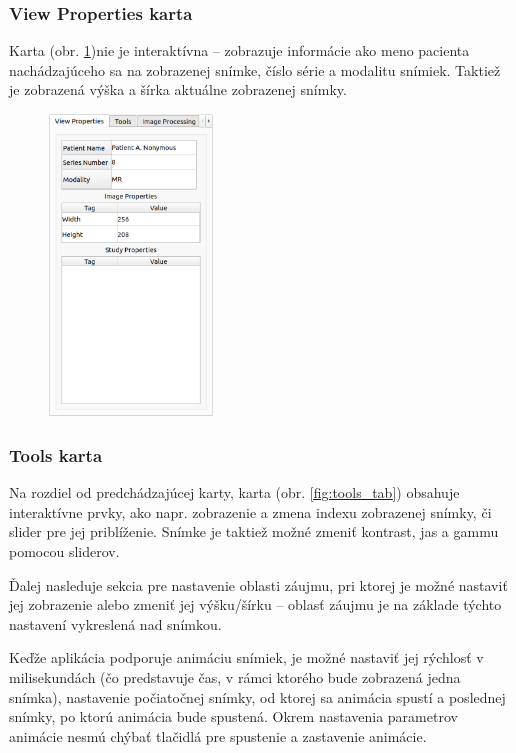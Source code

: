 {\subsubsection {View Properties karta}
Karta  (obr. \ref{fig:view_properties_tab})nie je interaktívna -- zobrazuje informácie ako meno pacienta nachádzajúceho sa na zobrazenej snímke, číslo série a modalitu snímiek. Taktiež je zobrazená výška a šírka aktuálne zobrazenej snímky.

\begin {figure}[H]
        \centering
        \includegraphics[height=8cm]{media/existing_app/tabs/view_properties.png}
        \captionsetup{justification=centering}
        \label{fig:view_properties_tab}
\end {figure}

\clearpage

\subsubsection {Tools karta}
Na rozdiel od predchádzajúcej karty,  karta (obr. \ref{fig:tools_tab}) obsahuje interaktívne prvky, ako napr. zobrazenie a zmena indexu zobrazenej snímky, či slider pre jej priblíženie. Snímke je taktiež možné zmeniť kontrast, jas a gammu pomocou sliderov.

Ďalej nasleduje sekcia pre nastavenie oblasti záujmu, pri ktorej je možné nastaviť jej zobrazenie alebo zmeniť jej výšku/šírku -- oblasť záujmu je na základe týchto nastavení vykreslená nad snímkou. 

Keďže aplikácia podporuje animáciu snímiek, je možné nastaviť jej rýchlosť v milisekundách (čo predstavuje čas, v rámci ktorého bude zobrazená jedna snímka), nastavenie počiatočnej snímky, od ktorej sa animácia spustí a poslednej snímky, po ktorú animácia bude spustená. Okrem nastavenia parametrov animácie nesmú chýbať tlačidlá pre spustenie a zastavenie animácie.

}
